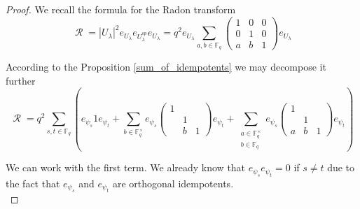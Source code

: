 \documentclass[12pt,reqno]{amsart}
\theoremstyle{definition}
\theoremstyle{remark}
\numberwithin{equation}{section}
\DeclareMathOperator{\R}{\mathcal{R}}
\def\IM#1{\textcolor[rgb]{0.00,0.00,0.75}{[I: #1]}}
\begin{document}
\begin{proof} We recall the formula for the Radon transform
\[
\R= |U_{\lambda}|^2e_{U_{\lambda}}e_{U_{\lambda}^{op}}e_{U_{\lambda}}=q^2e_{U_{\lambda}}\sum_{a,b\in\mathbb{F}_q}\begin{pmatrix}
    1 & 0 & 0\\
    0 & 1 & 0\\
    a & b & 1
\end{pmatrix}
e_{U_{\lambda}}
\]





According to the Proposition \ref{sum_of_idempotents} we may decompose it further
    \[\R =q^2\sum_{s,t\in \mathbb{F}_q} \left( e_{\psi_s} 1 e_{\psi_t} + \sum_{b \in \mathbb{F}_q^\times} e_{\psi_s} 
    \begin{pmatrix}
        1 & & \\
        & 1 & \\
        & b & 1
    \end{pmatrix} e_{\psi_t}+ \sum_{\substack{a \in \mathbb{F}_q^\times\\b \in \mathbb{F}_q}} e_{\psi_s}
    \begin{pmatrix}
        1 & & \\
         & 1 & \\
        a & b & 1
    \end{pmatrix} e_{\psi_t}\right)\]
    
    We can work with the first term. We already know that $e_{\psi_s} e_{\psi_t} = 0$ if $s \ne t$ due to the fact that $e_{\psi_s}$ and $e_{\psi_t}$ are orthogonal idempotents.\\
    

\end{proof}
\end{document}

